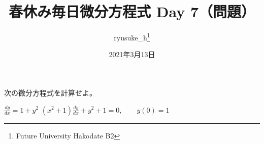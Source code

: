 \documentclass[a4j]{jsarticle}
\title{春休み毎日微分方程式 Day 7（問題）}
\author{ryusuke\_h\thanks{Future University Hakodate B2}}
\date{2021年3月13日}
\begin{document}
\begin{spacing}{1.6}
\maketitle

次の微分方程式を計算せよ。
\begin{qparts}
    \qpart $ \displaystyle \frac{dy}{dx} = 1 + y ^ 2 $
    \qpart $ \displaystyle (x^2 + 1)\frac{dy}{dx} + y ^ 2 + 1 = 0, \qquad y(0) = 1 $
  \end{qparts}
\end{spacing}
\end{document}

